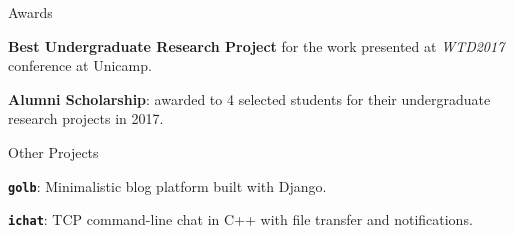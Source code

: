 \documentclass[8pt]{resume}
\newcommand{\tit}[1]{\textit{#1}}
\newcommand{\tbf}[1]{\textbf{#1}}
\newcommand{\ttt}[1]{\texttt{#1}}
\begin{document}
\begin{rSection}{Awards}
\begin{rSubsection}{}{}{}{}
    \vspace{-0.5em}
    \item \tbf{Best Undergraduate Research Project} for the work presented at \tit{WTD2017} conference at Unicamp.
    \item \tbf{Alumni Scholarship}: awarded to 4 selected students for their undergraduate research projects in 2017.
\end{rSubsection}
\end{rSection}

\begin{rSection}{Other Projects}
\begin{rSubsection}{}{}{}{}
    \vspace{-0.5em}
    \item \tbf{\ttt{golb}}: Minimalistic blog platform built with Django.
    \item \tbf{\ttt{ichat}}: TCP command-line chat in C++ with file transfer and
        notifications.
\end{rSubsection}

\end{rSection}
\end{document}
